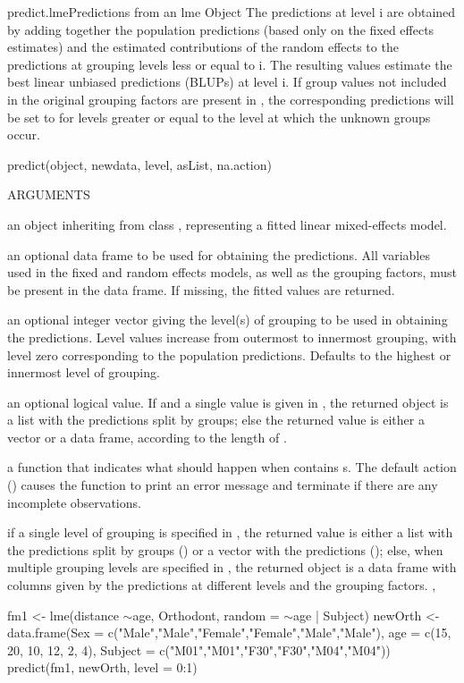 \documentclass[pdftex]{article} \usepackage{url,graphicx}
\renewcommand{\Twiddle}{\mbox{\(\sim\)}}
\begin{document}
\begin{Helpfile}{predict.lme}{Predictions from an lme Object}
The predictions at level i are obtained by adding together the
population predictions (based only on the fixed effects estimates)
and the estimated contributions of the random effects to the
predictions at grouping levels less or equal to i. The resulting
values estimate the best linear unbiased predictions (BLUPs) at level
i. If group values not included in the original grouping factors
are present in , the corresponding predictions will be
set to  for levels greater or equal to the level at which the
unknown groups occur.
\begin{Example}
predict(object, newdata, level, asList, na.action)
\end{Example}
\begin{Argument}{ARGUMENTS}
\item[\Co{object:}]
an object inheriting from class , representing
a fitted linear mixed-effects model.
\item[\Co{newdata:}]
an optional data frame to be used for obtaining the
predictions. All variables used in the fixed and random effects
models, as well as the grouping factors, must be present in the data
frame. If missing, the fitted values are returned.
\item[\Co{level:}]
an optional integer vector giving the level(s) of grouping
to be used in obtaining the predictions. Level values increase from
outermost to innermost grouping, with level zero corresponding to the
population predictions. Defaults to the highest or innermost level of
grouping.
\item[\Co{asList:}]
an optional logical value. If  and a single
value is given in , the returned object is a list with
the predictions split by groups; else the returned value is
either a vector or a data frame, according to the length of
. 
\item[\Co{na.action:}]
a function that indicates what should happen when
 contains s.  The default action
() causes the function to print an error message and
terminate if there are any incomplete observations.
\end{Argument}
if a single level of grouping is specified in , the
returned value is either a list with the predictions split by groups
() or a vector with the predictions
(); else, when multiple grouping levels are
specified in , the returned object is a data frame with
columns given by the predictions at different levels and the grouping
factors.
, 
\need 15pt
\vspace{-16pt} 
\begin{Example}
fm1 <- lme(distance \Twiddle age, Orthodont, random = \Twiddle age | Subject)
newOrth <- data.frame(Sex = c("Male","Male","Female","Female","Male","Male"),
                      age = c(15, 20, 10, 12, 2, 4),
                      Subject = c("M01","M01","F30","F30","M04","M04"))
predict(fm1, newOrth, level = 0:1)
\end{Example}
\end{Helpfile}
\end{document}
